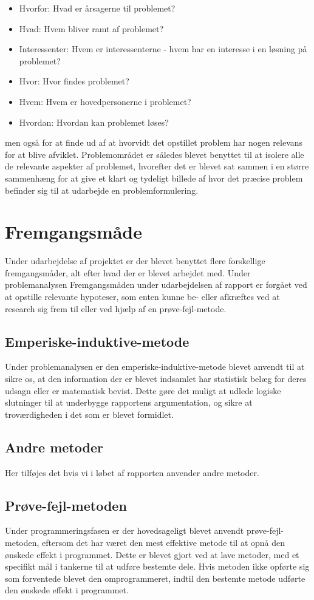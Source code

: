 \begin{itemize}
\item Hvorfor: Hvad er årsagerne til problemet?
\item Hvad: Hvem bliver ramt af problemet?
\item Interessenter: Hvem er interessenterne - hvem har en interesse i en løsning på problemet?
\item Hvor: Hvor findes problemet?
\item Hvem: Hvem er hovedpersonerne i problemet?
\item Hvordan: Hvordan kan problemet løses?
\end{itemize}
men også for at finde ud af at hvorvidt det opstillet problem har nogen relevans for at blive afviklet. Problemområdet er således blevet benyttet til at isolere alle de relevante aspekter af problemet, hvorefter det er blevet sat sammen i en større sammenhæng for at give et klart og tydeligt billede af hvor det præcise problem befinder sig til at udarbejde en problemformulering.

\section{Fremgangsmåde}
Under udarbejdelse af projektet er der blevet benyttet flere forskellige fremgangsmåder, alt efter hvad der er blevet arbejdet med. Under problemanalysen Fremgangsmåden under udarbejdelsen af rapport er forgået ved at opstille relevante hypoteser, som enten kunne be- eller afkræftes ved at research sig frem til eller ved hjælp af en prøve-fejl-metode.

\subsection{Emperiske-induktive-metode}
Under problemanalysen er den emperiske-induktive-metode blevet anvendt til at sikre os, at den information der er blevet indsamlet har statistisk belæg for deres udsagn eller er matematisk bevist. Dette gøre det muligt at udlede logiske slutninger til at underbygge rapportens argumentation, og sikre at troværdigheden i det som er blevet formidlet.

\subsection{Andre metoder}
Her tilføjes det hvis vi i løbet af rapporten anvender andre metoder.

\subsection{Prøve-fejl-metoden}
Under programmeringsfasen er der hovedsageligt blevet anvendt prøve-fejl-metoden, eftersom det har været den mest effektive metode til at opnå den ønskede effekt i programmet. Dette er blevet gjort ved at lave metoder, med et specifikt mål i tankerne til at udføre bestemte dele. Hvis metoden ikke opførte sig som forventede blevet den omprogrammeret, indtil den bestemte metode udførte den ønskede effekt i programmet.

